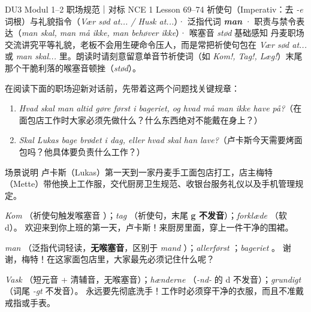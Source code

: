{DU3 Modul 1--2 职场规范｜对标 NCE 1 Lesson 69--74}
{祈使句（Imperativ：去 \textit{-e} 词根）与礼貌指令（\textit{Vær sød at... / Husk at...}）· 泛指代词 \textbf{\textit{man}} · 职责与禁令表达（\textit{man skal, man må ikke, man behøver ikke}）· 喉塞音 \textit{stød} 基础感知}
{丹麦职场交流讲究平等礼貌，老板不会用生硬命令压人，而是常把祈使句包在 \textit{Vær sød at...} 或 \textit{man skal...} 里。朗读时请刻意留意单音节祈使词（如 \textit{Kom!, Tag!, Læg!}）末尾那个干脆利落的喉塞音顿挫（\textit{stød}）。}

\begin{foerduleaeser}
在阅读下面的职场迎新对话前，先带着这两个问题找关键规章：
\begin{enumerate}
  \item \textit{Hvad skal man altid gøre først i bageriet, og hvad må man ikke have på?}（在面包店工作时大家必须先做什么？什么东西绝对不能戴在身上？）
  \item \textit{Skal Lukas bage brødet i dag, eller hvad skal han lave?}（卢卡斯今天需要烤面包吗？他具体要负责什么工作？）
\end{enumerate}
\end{foerduleaeser}


\begin{tipbox}{场景说明}
卢卡斯（Lukas）第一天到一家丹麦手工面包店打工，店主梅特（Mette）带他换上工作服，交代厨房卫生规范、收银台服务礼仪以及手机管理规定。
\end{tipbox}

{\textit{Kom} （祈使句触发喉塞音 ）；\textit{tag} （祈使句，末尾 \textbf{g 不发音}）；\textit{forklæde} （软 d）。}
{欢迎来到你上班的第一天，卢卡斯！来厨房里面，穿上一件干净的围裙。}

{\textit{man} （泛指代词轻读，\textbf{无喉塞音}，区别于 \textit{mand} ）；\textit{allerførst} ；\textit{bageriet} 。}
{谢谢，梅特！在这家面包店里，大家最先必须记住什么呢？}

{\textit{Vask} （短元音 + 清辅音，无喉塞音）；\textit{hænderne} （\textit{-nd-} 的 d 不发音）；\textit{grundigt} （词尾 \textit{-gt} 不发音）。}
{永远要先彻底洗手！工作时必须穿干净的衣服，而且不准戴戒指或手表。}

